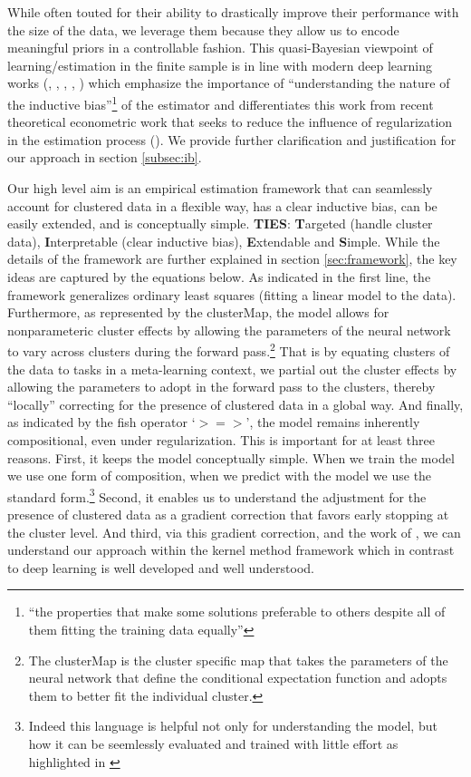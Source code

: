 \documentclass[a4paper,12pt]{article}
\begin{document}
While often touted for their ability to drastically improve their performance with the size of the data, we leverage them because they allow us to encode meaningful priors in a controllable fashion. This quasi-Bayesian viewpoint of learning/estimation in the finite sample is in line with modern deep learning works (\cite{jacot2018neural},  \cite{nagarajan2019uniform}, \cite{wilson2020case}, \cite{belkin2021fit}, \cite{zhang2021understanding}) which emphasize the importance of ``understanding the nature of the inductive bias''\footnote{\cite{belkin2021fit} ``the properties that make some solutions preferable to others despite all of them fitting the training data equally''} of the estimator and differentiates this work from recent theoretical econometric work that seeks to reduce the influence of regularization in the estimation process (\cite{chernozhukov2018double}). We provide further clarification and justification for our approach in section \ref{subsec:ib}.\par 
Our high level aim is an empirical estimation framework that can seamlessly account for clustered data in a flexible way, has a clear inductive bias, can be easily extended, and is conceptually simple. \textbf{TIES}: \textbf{T}argeted (handle cluster data), \textbf{I}nterpretable (clear inductive bias), \textbf{E}xtendable and \textbf{S}imple. While the details of the framework are further explained in section \ref{sec:framework}, the key ideas are captured by the equations below. As indicated in the first line, the framework generalizes ordinary least squares (fitting a linear model to the data). Furthermore, as represented by the clusterMap, the model allows for nonparameteric cluster effects by allowing the parameters of the neural network to vary across clusters during the forward pass.\footnote{The clusterMap is the cluster specific map that takes the parameters of the neural network that define the conditional expectation function and adopts them to better fit the individual cluster.} That is by equating clusters of the data to tasks in a meta-learning context, we partial out the cluster effects by allowing the parameters to adopt in the forward pass to the clusters, thereby ``locally'' correcting for the presence of clustered data in a global way. And finally, as indicated by the fish operator `$>=>$', the model remains inherently compositional, even under regularization. This is important for at least three reasons. First, it keeps the model conceptually simple. When we train the model we use one form of composition, when we predict with the model we use the standard form.\footnote{Indeed this language is helpful not only for understanding the model, but how it can be seemlessly evaluated and trained with little effort as highlighted in \cite{frostig2018compiling}}  Second, it enables us to understand the adjustment for the presence of clustered data as a gradient correction that favors early stopping at the cluster level. And third, via this gradient correction, and the work of \cite{domingos2020every}, we can understand our approach within the kernel method framework which in contrast to deep learning is well developed and well understood.
\end{document}
